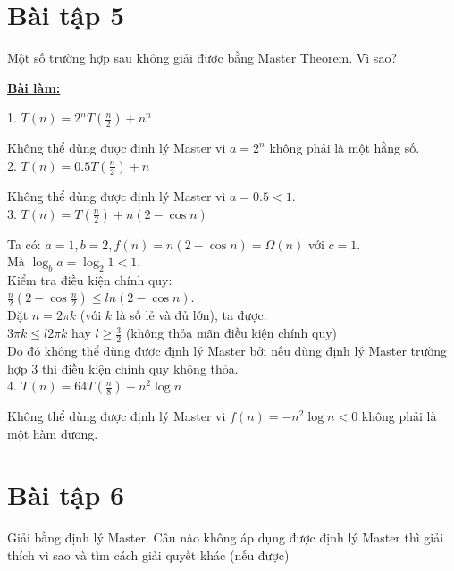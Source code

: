 \documentclass[12pt, a4paper, fleqn]{article}
\begin{document}
	
	\clearpage

	\section*{Bài tập 5}
		Một số trường hợp sau không giải được bằng Master Theorem. Vì sao?
		
		\begin{center}
			\textbf{\underline{Bài làm:}}
		\end{center}
		
		1. $\displaystyle
		T(n) = 2^n T\left( \frac{n}{2} \right) + n^n$
		
		Không thể dùng được định lý Master vì $a = 2^n$ không phải là một hằng số.\\
		
		2. $\displaystyle
		T(n) = 0.5T\left( \frac{n}{2} \right) + n$
		
		Không thể dùng được định lý Master vì $a = 0.5 < 1$.\\
		
		3. $\displaystyle
		T(n) = T\left( \frac{n}{2}\right) + n \left( 2 - \cos n \right)$
		
		Ta có: $a = 1, b = 2, f(n) = n \left( 2 - \cos n \right) = \Omega (n)$ với $c = 1$.\\
		Mà $\log_{b} a = \log_{2} 1 < 1$.\\
		Kiểm tra điều kiện chính quy:\\
		$\displaystyle
		\frac{n}{2} \left( 2 - \cos{\frac{n}{2}} \right) \leq ln \left( 2 - \cos n \right)$.\\
		Đặt $n = 2 \pi k$ (với $k$ là số lẻ và đủ lớn), ta được:\\
		$\displaystyle
		3 \pi k \leq l 2 \pi k$ hay $\displaystyle
		l \geq \frac{3}{2}$ (không thỏa mãn điều kiện chính quy)\\
		Do đó không thể dùng được định lý Master bởi nếu dùng định lý Master trường hợp 3 thì điều kiện chính quy không thỏa.\\
		
		4. $\displaystyle
		T(n) = 64T\left( \frac{n}{8} \right) - n^2 \log n$
		
		Không thể dùng được định lý Master vì $f(n) = - n^2 \log n < 0$ không phải là một hàm dương.
		
	
	\clearpage
	
	\section*{Bài tập 6}
		Giải bằng định lý Master. Câu nào không áp dụng được định lý Master thì giải thích vì sao và tìm cách giải quyết khác (nếu được)
		
\end{document}
